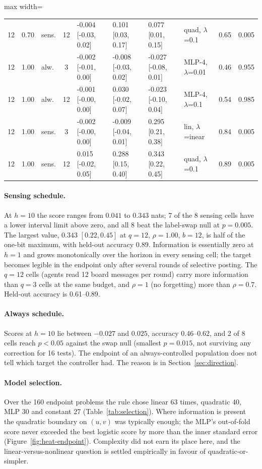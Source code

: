 \documentclass[10pt]{article}
\begin{document}
\begin{table}[htbp]
\begin{adjustbox}{max width=\textwidth}
\begin{tabular}{cclc lll l cc}
12 & 0.70 & sens. & 12 & -0.004 [-0.03, 0.02] & 0.101 [0.03, 0.17] & 0.077 [0.01, 0.15] & quad, $\lambda$=0.1 & 0.65 & 0.005 \\
12 & 1.00 & alw. & 3 & -0.002 [-0.01, 0.00] & -0.008 [-0.03, 0.02] & -0.027 [-0.08, 0.01] & MLP-4, $\lambda$=0.01 & 0.46 & 0.955 \\
12 & 1.00 & alw. & 12 & -0.001 [-0.00, 0.00] & 0.030 [-0.02, 0.07] & -0.023 [-0.10, 0.04] & MLP-4, $\lambda$=0.1 & 0.54 & 0.985 \\
12 & 1.00 & sens. & 3 & -0.002 [-0.00, 0.00] & -0.009 [-0.04, 0.01] & 0.295 [0.21, 0.38] & lin, $\lambda$=inear & 0.84 & 0.005 \\
12 & 1.00 & sens. & 12 & 0.015 [-0.02, 0.05] & 0.288 [0.15, 0.40] & 0.343 [0.22, 0.45] & quad, $\lambda$=0.1 & 0.89 & 0.005 \\
\bottomrule
\end{tabular}
\end{adjustbox}
\end{table}

\paragraph{Sensing schedule.} At $h=10$ the score ranges from $0.041$ to $0.343$ nats; 7 of the 8 sensing cells have a lower interval limit above zero, and all 8 beat the label-swap null at $p=0.005$. The largest value, $0.343$ $[0.22,0.45]$ at $q=12$, $\rho=1.00$, $b=12$, is half of the one-bit maximum, with held-out accuracy $0.89$. Information is essentially zero at $h=1$ and grows monotonically over the horizon in every sensing cell; the target becomes legible in the endpoint only after several rounds of selective posting. The $q=12$ cells (agents read 12 board messages per round) carry more information than $q=3$ cells at the same budget, and $\rho=1$ (no forgetting) more than $\rho=0.7$. Held-out accuracy is 0.61--0.89.

\paragraph{Always schedule.} Scores at $h=10$ lie between $-0.027$ and $0.025$, accuracy 0.46--0.62, and 2 of 8 cells reach $p<0.05$ against the swap null (smallest $p=0.015$, not surviving any correction for 16 tests). The endpoint of an always-controlled population does not tell which target the controller had. The reason is in Section~\ref{sec:direction}.

\paragraph{Model selection.} Over the 160 endpoint problems the rule chose linear 63 times, quadratic 40, MLP 30 and constant 27 (Table~\ref{tab:selection}). Where information is present the quadratic boundary on $(u,v)$ was typically enough; the MLP's out-of-fold score never exceeded the best logistic score by more than the inner standard error (Figure~\ref{fig:heat-endpoint}). Complexity did not earn its place here, and the linear-versus-nonlinear question is settled empirically in favour of quadratic-or-simpler.
\end{document}
